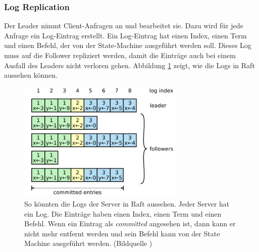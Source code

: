 \subsubsection{Log Replication}


Der Leader nimmt Client-Anfragen an und bearbeitet sie. Dazu wird für jede Anfrage ein Log-Eintrag erstellt. Ein Log-Eintrag hat einen Index, einen Term und einen Befehl, der von der State-Machine ausgeführt werden soll. Dieses Log muss auf die Follower repliziert werden, damit die Einträge auch bei einem Ausfall des Leaders nicht verloren gehen. Abbildung \ref{fig:log} zeigt, wie die Logs in Raft aussehen können.

\begin{figure}[H]
	\centering
	\includegraphics[width=300px]{img/log.png}
	\caption{So könnten die Logs der Server in Raft aussehen. Jeder Server hat ein Log. Die Einträge haben einen Index, einen Term und einen Befehl. Wenn ein Eintrag als \textit{committed} angesehen ist, dann kann er nicht mehr entfernt werden und sein Befehl kann von der State Machine ausgeführt werden. (Bildquelle \cite{raft-thesis})}
	\label{fig:log}
\end{figure}

